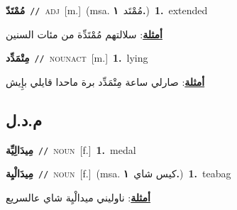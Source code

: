 \documentclass[10pt,a4paper,twoside]{article} %
\begin{document}
\begin{multicols}{2}
{\setlength\topsep{0pt}\textbf{\foreignlanguage{arabic}{مُمْتَدّ}}\ {\color{gray}\texttt{//}\color{black}}\ \textsc{adj}\ [m.]\ \color{gray}(msa. \foreignlanguage{arabic}{مُمْتَد}~\foreignlanguage{arabic}{\textbf{١.}})\color{black}\ \textbf{1.}~extended\  \begin{flushright}\color{gray}\foreignlanguage{arabic}{\textbf{\underline{\foreignlanguage{arabic}{أمثلة}}}: سلالتهم مُمْتَدِّة من مئات السنين}\end{flushright}\color{black}} \vspace{2mm}

{\setlength\topsep{0pt}\textbf{\foreignlanguage{arabic}{مِتْمَدِّد}}\ {\color{gray}\texttt{//}\color{black}}\ \textsc{noun\textunderscore act}\ [m.]\ \textbf{1.}~lying\  \begin{flushright}\color{gray}\foreignlanguage{arabic}{\textbf{\underline{\foreignlanguage{arabic}{أمثلة}}}: صارلي ساعة مِتْمَدِّد برة ماحدا قايلي بإِيش}\end{flushright}\color{black}} \vspace{2mm}

\vspace{-3mm}
\subsection*{\color{blue}\foreignlanguage{arabic}{م.د.ل}\color{blue}{ (ntws)}} 

{\setlength\topsep{0pt}\textbf{\foreignlanguage{arabic}{مِيدَالِيِّة}}\ {\color{gray}\texttt{//}\color{black}}\ \textsc{noun}\ [f.]\ \textbf{1.}~medal\ } \vspace{2mm}

{\setlength\topsep{0pt}\textbf{\foreignlanguage{arabic}{مِيدَالْيِة}}\ {\color{gray}\texttt{//}\color{black}}\ \textsc{noun}\ [f.]\ \color{gray}(msa. \foreignlanguage{arabic}{كيس شاي}~\foreignlanguage{arabic}{\textbf{١.}})\color{black}\ \textbf{1.}~teabag\  \begin{flushright}\color{gray}\foreignlanguage{arabic}{\textbf{\underline{\foreignlanguage{arabic}{أمثلة}}}: ناوليني ميدالْيِة شاي عالسريع}\end{flushright}\color{black}} \vspace{2mm}


\end{multicols}
\end{document}
